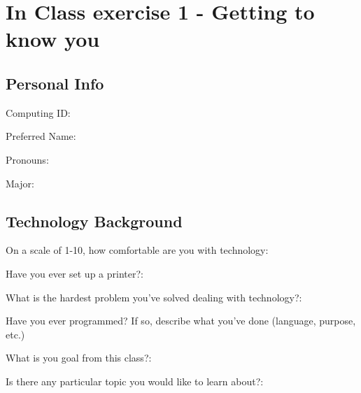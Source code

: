 \documentclass{article}
\begin{document}
    \onehalfspacing

    \section*{In Class exercise 1 - Getting to know you}

    \subsection*{Personal Info}
    Computing ID:

    Preferred Name:

    Pronouns:

    Major:

    \subsection*{Technology Background}
    On a scale of 1-10, how comfortable are you with technology:

    Have you ever set up a printer?:

    What is the hardest problem you've solved dealing with technology?:

    Have you ever programmed? If so, describe what you've done (language, purpose, etc.)

    What is you goal from this class?:

    Is there any particular topic you would like to learn about?:
\end{document}
